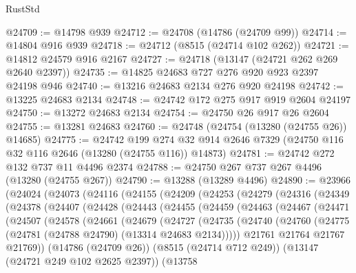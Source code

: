 \begin{lexlean}{RustStd}
\begin{coremodule}
@24709 := @14798 @939
@24712 := @24708 (@14786 (@24709 @99))
@24714 := @14804 @916 @939
@24718 := @24712 (@8515 (@24714 @102 @262))
@24721 := @14812 @24579 @916 @2167
@24727 := @24718 (@13147 (@24721 @262 @269 @2640 @2397))
@24735 := @14825 @24683 @727 @276 @920 @923 @2397 @24198 @946
@24740 := @13216 @24683 @2134 @276 @920 @24198
@24742 := @13225 @24683 @2134
@24748 := @24742 @172 @275 @917 @919 @2604 @24197
@24750 := @13272 @24683 @2134
@24754 := @24750 @26 @917 @26 @2604
@24755 := @13281 @24683
@24760 := @24748 (@24754 (@13280 (@24755 @26)) @14685)
@24775 := @24742
    @199
    @274
    @32
    @914
    @2646
    @7329
    (@24750 @116 @32 @116 @2646 (@13280 (@24755 @116)) @14873)
@24781 := @24742 @272 @132 @737 @11 @4496 @2374
@24788 := @24750 @267 @737 @267 @4496 (@13280 (@24755 @267))
@24790 := @13288 (@13289 @4496)
@24890 := @23966
    (@24024
      (@24073
        (@24116
          (@24155
            (@24209
              (@24253
                (@24279
                  (@24316
                    (@24349
                      (@24378
                        (@24407
                          (@24428
                            (@24443
                              (@24455
                                (@24459
                                  (@24463
                                    (@24467
                                      (@24471
                                        (@24507
                                          (@24578
                                            (@24661
                                              (@24679
                                                (@24727
                                                  (@24735
                                                    (@24740
                                                      (@24760
                                                        (@24775
                                                          (@24781
                                                            (@24788 @24790)
                                                            (@13314 @24683 @2134)))))
                                                    @21761
                                                    @21764
                                                    @21767
                                                    @21769))
                                                (@14786 (@24709 @26))
                                                (@8515 (@24714 @712 @249))
                                                (@13147 (@24721 @249 @102 @2625 @2397))
                                                (@13758

\end{coremodule}
\end{lexlean}
